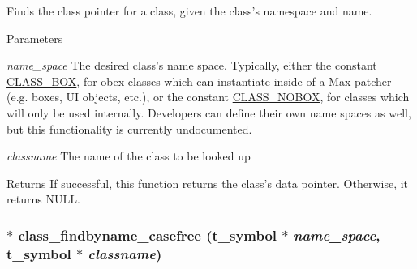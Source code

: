 Finds the class pointer for a class, given the class's namespace and name. 
\begin{DoxyParams}{Parameters}
\item[{\em name\_\-space}]The desired class's name space. Typically, either the constant \hyperlink{group__class_gaf640c99a1fceb8158c2d1e77381b0320}{CLASS\_\-BOX}, for obex classes which can instantiate inside of a Max patcher (e.g. boxes, UI objects, etc.), or the constant \hyperlink{group__class_ga090d3cbc4f137661806fc1b72249a791}{CLASS\_\-NOBOX}, for classes which will only be used internally. Developers can define their own name spaces as well, but this functionality is currently undocumented. \item[{\em classname}]The name of the class to be looked up\end{DoxyParams}
\begin{DoxyReturn}{Returns}
If successful, this function returns the class's data pointer. Otherwise, it returns NULL. 
\end{DoxyReturn}
\hypertarget{group__class_gacfffc94c91ff5254f8acc363be75b577}{
\subsubsection[{class\_\-findbyname\_\-casefree}]{$\ast$ class\_\-findbyname\_\-casefree ({\bf t\_\-symbol} $\ast$ {\em name\_\-space}, \/  {\bf t\_\-symbol} $\ast$ {\em classname})}}
\label{group__class_gacfffc94c91ff5254f8acc363be75b577}


